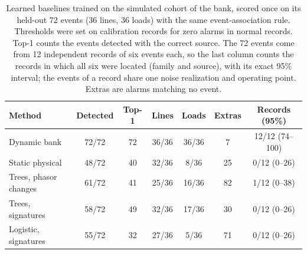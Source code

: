 \begin{table}[t]\centering\scriptsize\setlength{\tabcolsep}{2pt}
\caption{Learned baselines trained on the simulated cohort of the bank, scored once on its held-out 72 events (36 lines, 36 loads) with the same event-association rule. Thresholds were set on calibration records for zero alarms in normal records. Top-1 counts the events detected with the correct source. The 72 events come from 12 independent records of six events each, so the last column counts the records in which all six were located (family and source), with its exact 95\% interval; the events of a record share one noise realization and operating point. Extras are alarms matching no event.}
\label{tab:fair-baselines}
\begin{tabular}{lcccccc}\toprule
Method & Detected & Top-1 & Lines & Loads & Extras & Records (95\%) \\\midrule
Dynamic bank & 72/72 & 72 & 36/36 & 36/36 & 7 & 12/12 (74--100) \\
Static physical & 48/72 & 40 & 32/36 & 8/36 & 25 & 0/12 (0--26) \\
Trees, phasor changes & 61/72 & 41 & 25/36 & 16/36 & 82 & 1/12 (0--38) \\
Trees, signatures & 58/72 & 49 & 32/36 & 17/36 & 30 & 0/12 (0--26) \\
Logistic, signatures & 55/72 & 32 & 27/36 & 5/36 & 71 & 0/12 (0--26) \\
\bottomrule\end{tabular}\end{table}
